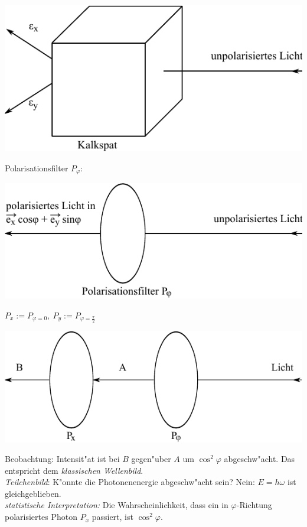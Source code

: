 \documentclass[a4paper]{scrartcl}
\begin{document}
{\begin{center}
\includegraphics{003Kalkspat}
\end{center}
Polarisationsfilter $P_\varphi$:
\begin{center}
\includegraphics{003Polarisationsfilter1}
\end{center}
$P_x := P_{\varphi = 0}, \ P_y := P_{\varphi = \frac\pi2}$
\begin{center}
\includegraphics{003Polarisationsfilter2}
\end{center}
Beobachtung: Intensit"at ist bei $B$ gegen"uber $A$ um $\cos^2 \varphi$ abgeschw"acht. Das entspricht dem \emph{klassischen Wellenbild}. \\
\emph{Teilchenbild}: K"onnte die Photonenenergie abgeschw"acht sein? Nein: $E = h \omega$ ist gleichgeblieben. \\
\emph{statistische Interpretation:} 
Die Wahrscheinlichkeit, dass ein in $\varphi$-Richtung polarisiertes Photon $P_x$ passiert, ist $\cos^2 \varphi$.

}
\end{document}
